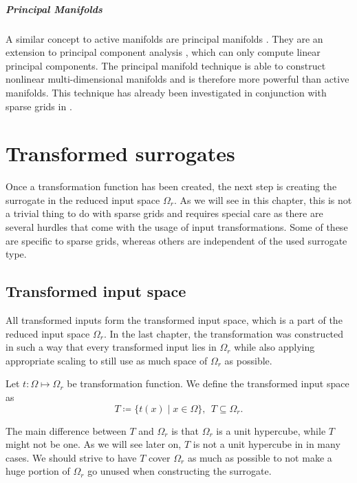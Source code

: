 \documentclass[
  a4paper,  %
  twoside,  %
  bibliography=totoc,
  headsepline,
  cleardoublepage=empty,
  parskip=half,
  draft=false
]{scrbook}
\begin{document}
\paragraph{Principal Manifolds}
A similar concept to active manifolds are principal manifolds \cite{Huo2008}.
They are an extension to principal component analysis \cite{Abdi2010}, which can only compute linear principal components.
The principal manifold technique is able to construct nonlinear multi-dimensional manifolds and is therefore more powerful than active manifolds.
This technique has already been investigated in conjunction with sparse grids in \cite{Feuersaenger2009}.

\chapter{Transformed surrogates}
\label{chap:c4}

Once a transformation function has been created, the next step is creating the surrogate in the reduced input space $\Omega_r$.
As we will see in this chapter, this is not a trivial thing to do with sparse grids and requires special care as there are several hurdles that come with the usage of input transformations.
Some of these are specific to sparse grids, whereas others are independent of the used surrogate type.

\section{Transformed input space}
\label{sec:tis}

All transformed inputs form the transformed input space, which is a part of the reduced input space $\Omega_r$.
In the last chapter, the transformation was constructed in such a way that every transformed input lies in $\Omega_r$ while also applying appropriate scaling to still use as much space of $\Omega_r$ as possible.

\begin{definition}
Let $t \colon \Omega \mapsto \Omega_r$ be transformation function.
We define the transformed input space as
\begin{equation}
T \coloneqq \{t(x) \mid x \in\Omega\}, ~~ T \subseteq \Omega_r.
\end{equation}
\end{definition}
%
The main difference between $T$ and $\Omega_r$ is that $\Omega_r$ is a unit hypercube, while $T$ might not be one.
As we will see later on, $T$ is not a unit hypercube in in many cases.
We should strive to have $T$ cover $\Omega_r$ as much as possible to not make a huge portion of $\Omega_r$ go unused when constructing the surrogate.
\end{document}
